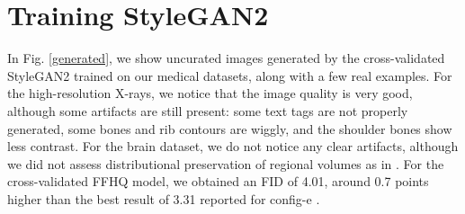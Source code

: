 \documentclass{article}
\newcommand{\fld}{results}
\newcommand{\w}{2.5cm}
\begin{document}
\section{Training StyleGAN2}
\label{training}

In Fig. \ref{generated}, we show uncurated images generated by the cross-validated StyleGAN2 trained on our medical datasets, along with a few real examples. For the high-resolution X-rays, we notice that the image quality is very good, although some artifacts are still present: some text tags are not properly generated, some bones and rib contours are wiggly, and the shoulder bones show less contrast. For the brain dataset, we do not notice any clear artifacts, although we did not assess distributional preservation of regional volumes as in \cite{tudosiu2020neuromorphologicaly}. For the cross-validated FFHQ model, we obtained an FID of 4.01, around 0.7 points higher than the best result of 3.31 reported for config-e \cite{karras2020analyzing}.


\FloatBarrier





\newcommand{\genF}{\fld/00610-generate-images-ffhq/}
\newcommand{\genX}{\fld/00618-generate-images-xray/}
\newcommand{\genB}{\fld/00619-generate-images-brains/}

\newcommand{\realX}{images}


\newcommand{\realB}{images}


\renewcommand{\w}{2.7cm}
\end{document}
